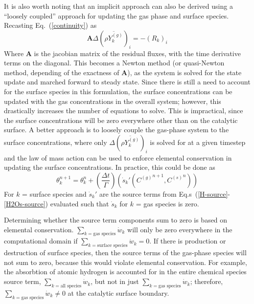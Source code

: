 \documentclass{report}
\newcommand{\eref}[1]{Eq.~(\ref{#1})}
\newcommand{\erefs}[2]{Eq.s~(\ref{#1}-\ref{#2})}
\newcommand{\sk}{\dot{s}_k}
\newcommand{\cg}[1]{{C_{#1}^{(g)}}}
\newcommand{\cs}[1]{{C_{#1}^{(s)}}}
\newcommand{\ry}{{\rho Y_{k}^{(g)}}}
\newcommand{\ma}{\mathbf{A}}
\begin{document}
\begin{enumerate}[label=(\alph*)]
    It is also worth noting that an implicit approach can also be derived
    using a ``loosely coupled'' approach for updating the gas phase and surface
    species. Recasting \eref{continuity} as
    \begin{equation}
      \ma \Delta (\overline{\ry})_i = -(R_k)_i
      \label{implicit-continuity}
    \end{equation}
    Where $\ma$ is the jacobian matrix of the residual fluxes, with the time
    derivative terms on the diagonal.  This becomes a Newton method (or
    quasi-Newton method, depending of the exactness of $\ma$), as the system is
    solved for the state update and marched forward to steady state.  Since
    there is still a need to account for the surface species in this
    formulation, the surface concentrations can be updated with the gas
    concentrations in the overall system; however, this drastically increases
    the number of equations to solve.  This is impractical, since the surface
    concentrations will be zero everywhere other than on the catalytic surface.
    A better approach is to loosely couple the gas-phase system to the surface
    concentrations, where only $\Delta (\overline{\ry})_i$ is solved for at a
    given timestep and the law of mass action can be used to enforce elemental
    conservation in updating the surface concentrations.  In practice, this
    could be done as
    \begin{equation}
      \theta_{k}^{n+1} = \theta_{k}^{n} + \left(\frac{\Delta t}{\Gamma}
      \right)\left(\sk'(\cg{}^{n+1},\cs{}^{n})\right)
      \label{theta-update-decoupled}
    \end{equation}
    For $k$ = surface species and $\sk'$ are the source terms from
    \erefs{H-source}{H2Os-source} evaluated such that $\sk$ for $k$ = gas
    species is zero.

    Determining whether the source term components sum to zero is based on
    elemental conservation.  $\sum_{k=\text{gas species}}{\dot{w}_k}$ will only
    be zero everywhere in the computational domain if $\sum_{k=\text{surface
    species}}{\dot{w}_k} = 0$.  If there is production or destruction of surface
    species, then the source terms of the gas-phase species will not sum to
    zero, because this would violate elemental conservation. For example, the
    absorbtion of atomic hydrogen is accounted for in the entire chemical
    species source term, $\sum_{k=\text{all species}}{\dot{w}_k}$, but not in
    just $\sum_{k=\text{gas species}}{\dot{w}_k}$; therefore,
    $\sum_{k=\text{gas species}}{\dot{w}_k} \ne 0$ at the catalytic surface
    boundary. 

\end{enumerate}
\end{document}
